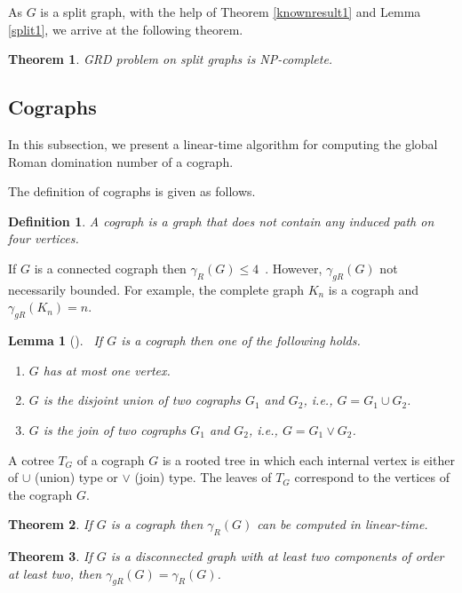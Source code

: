 \documentclass[preprint,12pt]{elsarticle}
\newtheorem{theorem}{Theorem}[section]
\newtheorem{lemma}{Lemma}
\newtheorem{definition}{Definition}{\bfseries}{\itshape}{\rmfamily}
\begin{document}
As $G$ is a split graph, with the help of Theorem \ref{knownresult1} and Lemma \ref{split1}, we arrive at the following theorem.
\begin{theorem}
    GRD problem on split graphs is NP-complete.
\end{theorem}

\subsection{Cographs}
In this subsection, we present a linear-time algorithm for computing the global Roman domination number of a cograph.

The definition of cographs is given as follows.
\begin{definition}
    A cograph is a graph that does not contain any induced path on four vertices.
\end{definition}
If $G$ is a connected cograph then $\gamma_R(G) \leq 4$~\cite{liedloff2008efficient}. However, $\gamma_{gR}(G)$ not necessarily  bounded. For example, the complete graph $K_n$ is a cograph and $\gamma_{gR}(K_n)=n$. 

\begin{lemma}[\cite{corneil1985linear}]~\label{cograph-structure}
    If $G$ is a cograph then one of the following holds.
    \begin{enumerate}
        \item $G$ has at most one vertex.
        \item $G$ is the disjoint union of two cographs $G_1$ and $G_2$, i.e.,
        $G=G_1 \cup G_2$.
        \item $G$ is the join of two cographs $G_1$ and $G_2$, i.e.,
        $G=G_1 \vee G_2$.
    \end{enumerate}
\end{lemma}
A cotree $T_G$ of a cograph $G$ is a rooted tree in which each internal vertex is either of
$\cup$ (union) type  or $\vee$ (join) type. The leaves of $T_G$ correspond to the vertices of the cograph $G$.

\begin{theorem}\cite{liedloff2008efficient}
If $G$ is a cograph then $\gamma_R(G)$ can be computed in linear-time.
\end{theorem}

\begin{theorem}\cite{atapour2015global} \label{th-disconnected}
    If $G$ is a disconnected graph with at least two components of order at
least two, then $\gamma_{gR}(G)=\gamma_{R}(G)$.
\end{theorem}
\end{document}
